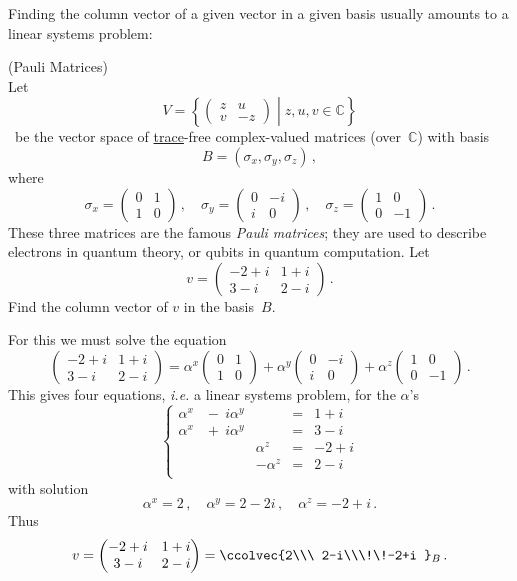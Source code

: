 Finding the column vector of a given vector in a given basis usually amounts to a linear systems problem:

\begin{example} (Pauli Matrices)\\
Let $$V=\left\{\begin{pmatrix}z&u\\v&-z\end{pmatrix}\middle| z,u,v\in{\mathbb C}\right\}$$\
be the vector space of \hyperlink{TRACE}{trace}-free complex-valued matrices (over~${\mathbb C}$) with basis
$$
B=(\sigma_x,\sigma_y,\sigma_z)\, ,
$$ where
$$
\sigma_x=\begin{pmatrix}0&1\\1&0\end{pmatrix}\, ,\quad
\sigma_y=\begin{pmatrix}0&-i\\i&0\end{pmatrix}\, ,\quad
\sigma_z=\begin{pmatrix}1&0\\0&-1\end{pmatrix}\, .
$$
These three matrices are the famous {\it Pauli matrices}; they are used to describe electrons in quantum theory, or qubits in quantum computation.
Let 
$$
v=\begin{pmatrix}
-2+i&1+i\\3-i&2-i
\end{pmatrix}\, .
$$
Find the column vector of $v$ in the basis~$B$.

For this we must solve the equation
$$
\begin{pmatrix}
-2+i&1+i\\3-i&2-i
\end{pmatrix}
=\alpha^x \begin{pmatrix}0&1\\1&0\end{pmatrix}+\alpha^y
\begin{pmatrix}0&-i\\i&0\end{pmatrix}+\alpha^z
\begin{pmatrix}1&0\\0&-1\end{pmatrix}\, .
$$
This gives four equations, {\it i.e.} a linear systems problem, for the $\alpha$'s
$$
\left\{
\begin{array}{rrrrr}
\alpha^x&\!\!-\ i\alpha^y&&=&1+i\\
\alpha^x&\!\!+\ i\alpha^y&&=&3-i\\
&&\alpha^z&=&-2+i\\
&&-\alpha^z&=&2-i\\
\end{array}
\right.
$$
with solution
$$
\alpha^x=2\, ,\quad \alpha^y=2-2i\, ,\quad \alpha^z=-2+i\, .
$$
Thus
$$
v=\begin{pmatrix}
-2+i&1+i\\3-i&2-i
\end{pmatrix}=\ccolvec{2\\\ 2-i\\\!\!-2+i }_B\, .
$$
\end{example}

